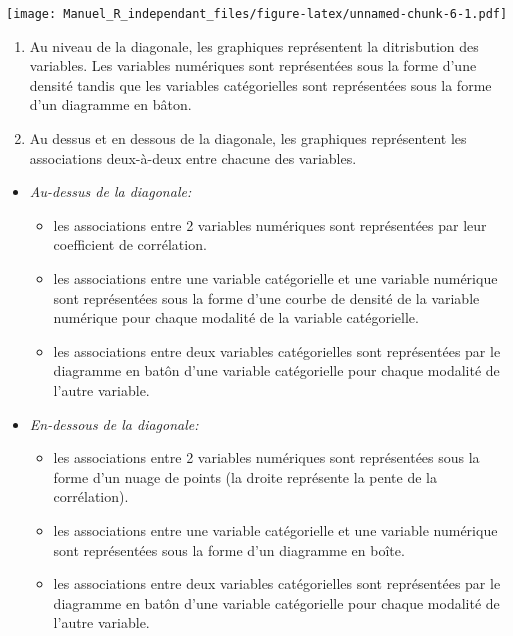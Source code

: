 \documentclass[
]{book}
\providecommand{\tightlist}{%
  \setlength{\itemsep}{0pt}\setlength{\parskip}{0pt}}
\begin{document}
\texttt{[image: Manuel\_R\_independant\_files/figure-latex/unnamed-chunk-6-1.pdf]}

\begin{enumerate}
\def\labelenumi{\arabic{enumi}.}
\item
  Au niveau de la diagonale, les graphiques représentent la ditrisbution des variables. Les variables numériques sont représentées sous la forme d'une densité tandis que les variables catégorielles sont représentées sous la forme d'un diagramme en bâton.
\item
  Au dessus et en dessous de la diagonale, les graphiques représentent les associations deux-à-deux entre chacune des variables.
\end{enumerate}

\begin{itemize}
\tightlist
\item
  \emph{Au-dessus de la diagonale:}

  \begin{itemize}
  \tightlist
  \item
    les associations entre 2 variables numériques sont représentées par leur coefficient de corrélation.
  \item
    les associations entre une variable catégorielle et une variable numérique sont représentées sous la forme d'une courbe de densité de la variable numérique pour chaque modalité de la variable catégorielle.
  \item
    les associations entre deux variables catégorielles sont représentées par le diagramme en batôn d'une variable catégorielle pour chaque modalité de l'autre variable.
  \end{itemize}
\item
  \emph{En-dessous de la diagonale:}

  \begin{itemize}
  \tightlist
  \item
    les associations entre 2 variables numériques sont représentées sous la forme d'un nuage de points (la droite représente la pente de la corrélation).
  \item
    les associations entre une variable catégorielle et une variable numérique sont représentées sous la forme d'un diagramme en boîte.
  \item
    les associations entre deux variables catégorielles sont représentées par le diagramme en batôn d'une variable catégorielle pour chaque modalité de l'autre variable.
  \end{itemize}
\end{itemize}
\end{document}
